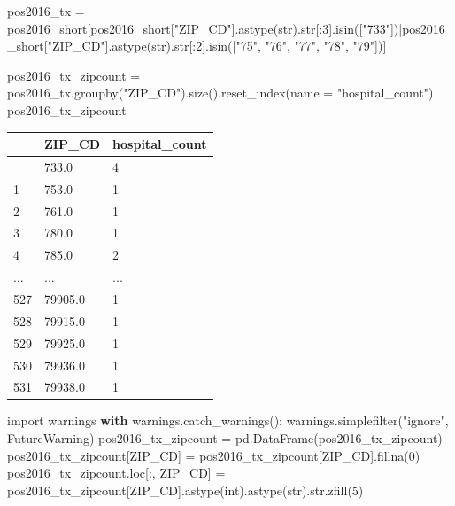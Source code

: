 \documentclass[
  letterpaper,
  DIV=11,
  numbers=noendperiod]{scrartcl}
\newenvironment{Shaded}{\begin{snugshade}}{\end{snugshade}}
\newcommand{\BuiltInTok}[1]{\textcolor[rgb]{0.00,0.23,0.31}{#1}}
\newcommand{\ControlFlowTok}[1]{\textcolor[rgb]{0.00,0.23,0.31}{\textbf{#1}}}
\newcommand{\DecValTok}[1]{\textcolor[rgb]{0.68,0.00,0.00}{#1}}
\newcommand{\ImportTok}[1]{\textcolor[rgb]{0.00,0.46,0.62}{#1}}
\newcommand{\NormalTok}[1]{\textcolor[rgb]{0.00,0.23,0.31}{#1}}
\newcommand{\OperatorTok}[1]{\textcolor[rgb]{0.37,0.37,0.37}{#1}}
\newcommand{\PreprocessorTok}[1]{\textcolor[rgb]{0.68,0.00,0.00}{#1}}
\newcommand{\StringTok}[1]{\textcolor[rgb]{0.13,0.47,0.30}{#1}}
\begin{document}
\begin{Shaded}
\begin{Highlighting}[]
\NormalTok{pos2016\_tx }\OperatorTok{=}\NormalTok{ pos2016\_short[pos2016\_short[}\StringTok{"ZIP\_CD"}\NormalTok{].astype(}\BuiltInTok{str}\NormalTok{).}\BuiltInTok{str}\NormalTok{[:}\DecValTok{3}\NormalTok{].isin([}\StringTok{"733"}\NormalTok{])}\OperatorTok{|}\NormalTok{pos2016\_short[}\StringTok{"ZIP\_CD"}\NormalTok{].astype(}\BuiltInTok{str}\NormalTok{).}\BuiltInTok{str}\NormalTok{[:}\DecValTok{2}\NormalTok{].isin([}\StringTok{"75"}\NormalTok{, }\StringTok{"76"}\NormalTok{, }\StringTok{"77"}\NormalTok{, }\StringTok{"78"}\NormalTok{, }\StringTok{"79"}\NormalTok{])]}

\NormalTok{pos2016\_tx\_zipcount }\OperatorTok{=}\NormalTok{ pos2016\_tx.groupby(}\StringTok{"ZIP\_CD"}\NormalTok{).size().reset\_index(name }\OperatorTok{=} \StringTok{"hospital\_count"}\NormalTok{)}
\NormalTok{pos2016\_tx\_zipcount}
\end{Highlighting}
\end{Shaded}

\begin{longtable}[]{@{}lll@{}}
\toprule\noalign{}
& ZIP\_CD & hospital\_count \\
\midrule\noalign{}
\endhead
\bottomrule\noalign{}
\endlastfoot
0 & 733.0 & 4 \\
1 & 753.0 & 1 \\
2 & 761.0 & 1 \\
3 & 780.0 & 1 \\
4 & 785.0 & 2 \\
... & ... & ... \\
527 & 79905.0 & 1 \\
528 & 79915.0 & 1 \\
529 & 79925.0 & 1 \\
530 & 79936.0 & 1 \\
531 & 79938.0 & 1 \\
\end{longtable}

\begin{Shaded}
\begin{Highlighting}[]
\ImportTok{import}\NormalTok{ warnings}
\ControlFlowTok{with}\NormalTok{ warnings.catch\_warnings():}
\NormalTok{    warnings.simplefilter(}\StringTok{"ignore"}\NormalTok{, }\PreprocessorTok{FutureWarning}\NormalTok{)}
\NormalTok{    pos2016\_tx\_zipcount }\OperatorTok{=}\NormalTok{ pd.DataFrame(pos2016\_tx\_zipcount)}
\NormalTok{    pos2016\_tx\_zipcount[}\StringTok{\textquotesingle{}ZIP\_CD\textquotesingle{}}\NormalTok{] }\OperatorTok{=}\NormalTok{ pos2016\_tx\_zipcount[}\StringTok{\textquotesingle{}ZIP\_CD\textquotesingle{}}\NormalTok{].fillna(}\DecValTok{0}\NormalTok{)}
\NormalTok{    pos2016\_tx\_zipcount.loc[:, }\StringTok{\textquotesingle{}ZIP\_CD\textquotesingle{}}\NormalTok{] }\OperatorTok{=}\NormalTok{ pos2016\_tx\_zipcount[}\StringTok{\textquotesingle{}ZIP\_CD\textquotesingle{}}\NormalTok{].astype(}\BuiltInTok{int}\NormalTok{).astype(}\BuiltInTok{str}\NormalTok{).}\BuiltInTok{str}\NormalTok{.zfill(}\DecValTok{5}\NormalTok{)}
\end{Highlighting}
\end{Shaded}
\end{document}
